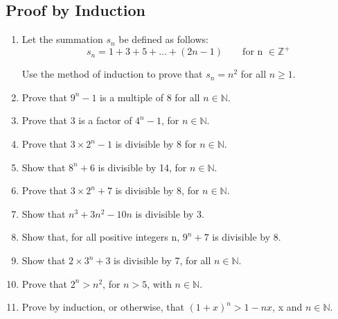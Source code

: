 \documentclass[]{report}
\begin{document}
\large
	
\subsection*{Proof by Induction}
\begin{enumerate}
\item Let the summation $s_n$ be defined as follows:
\[s_n = 1 + 3 + 5 + \ldots + (2n - 1) \qquad \mbox{for n }\in \mathbb{Z}^{+}\]

Use the method of induction to prove that $s_n = n^2$ for all $n \geq 1$.

\item Prove that $9^{n} - 1$ is a multiple of 8 for all $n \in \mathbb{N}.$
\item Prove that 3 is a factor of $4^{n} - 1$, for $n \in \mathbb{N}.$
\item Prove that $3\times 2^{n} - 1$ is divisible by 8 for $n \in \mathbb{N}.$
\item Show that $8^{n} + 6$ is divisible by 14, for $n \in \mathbb{N}.$
\item Prove that $3\times 2^{n} + 7$ is divisible by 8, for $n \in \mathbb{N}.$
\item Show that $n^3 + 3n^2 - 10n$ is divisible by 3. 

\item Show that, for all positive integers n, $9^{n} + 7$ is divisible by 8. 
\item  Show that $2\times 3^{n} + 3$ is divisible by 7, for all $n \in \mathbb{N}.$
\item  Prove that $2^{n} > n^2$, for $n > 5$, with $n \in \mathbb{N}.$
\item Prove by induction, or otherwise, that $(1 + x)^{n} >1 - nx$, x and $n \in \mathbb{N}$. 

\end{enumerate}
\end{document}

